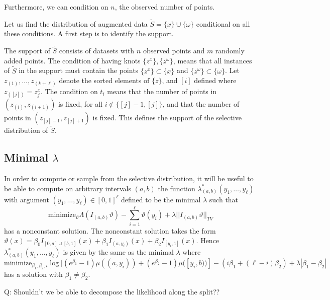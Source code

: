 \documentclass[11pt]{article}
\begin{document}
Furthermore, we can condition on $n$, the observed number of points.

Let us find the distribution of augmented data $\tilde{S} = \{x\} \cup
\{\omega\}$ conditional on all these conditions. A first step is to
identify the support.

The support of $\tilde{S}$ consists of datasets with $n$ observed
points and $m$ randomly added points.  The condition of having knots
$\{z^x\}, \{z^\omega\}$, means that all instances of $\tilde{S}$ in
the support must contain the points $\{z^x\} \subset \{x\}$ and
$\{z^\omega\} \subset \{\omega\}$.  Let $z_{(1)},\hdots, z_{(k +
  \ell)}$ denote the sorted elements of $\{z\}$, and $[i]$ defined
where $z_{([j])} = z_j^x$.  The condition on $t_i$ means that the
number of points in $(z_{(i)}, z_{(i+1)})$ is fixed, for all $i \notin
\{[j]-1, [j]\}$, and that the number of points in $(z_{[j]-1},
z_{[j]+1})$ is fixed.  This defines the support of the selective
distribution of $\tilde{S}$.

\subsection{Minimal $\lambda$}

In order to compute or sample from the selective distribution,
it will be useful to be able to compute on arbitrary intervals $(a, b)$ the function
$\lambda^*_{(a, b)}(y_1,\hdots, y_\ell)$ with argument $(y_1,\hdots, y_\ell) \in [0, 1]^\ell$
defined to be the minimal $\lambda$ such that
\[
\text{minimize}_\vartheta \Lambda(I_{(a,b)} \vartheta) - \sum_{i=1}^\ell
\vartheta(y_i) + \lambda ||I_{(a,b)} \vartheta ||_{TV}
\]
has a nonconstant solution.
The nonconstant solution takes the form $\vartheta(x) = \beta_0 I_{[0,a] \cup [b, 1]}(x) + \beta_1 I_{(a, y_i)}(x) + \beta_2 I_{[y_i, 1]}(x)$.
Hence $\lambda^*_{(a, b)}(y_1,\hdots, y_\ell)$ is given by the same as the minimal $\lambda$ where
\[
\text{minimize}_{\beta_1,\beta_2,i} \log[(e^{\beta_1}-1 )\mu((a,y_i)) + (e^{\beta_2}-1)\mu([y_i,b))] - (i\beta_1 + (\ell - i)\beta_2) + \lambda|\beta_1 - \beta_2|
\]
has a solution with $\beta_1 \neq \beta_2$.

Q: Shouldn't we be able to decompose the likelihood along the split??
\end{document}
